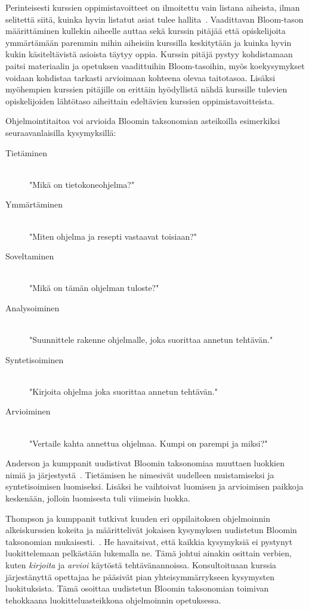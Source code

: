 \documentclass[finnish]{../tktltiki2}
\theoremstyle{definition}
\theoremstyle{remark}
\begin{document}
Perinteisesti kurssien oppimistavoitteet on ilmoitettu vain listana aiheista, ilman selitettä siitä, kuinka hyvin listatut asiat tulee hallita~\cite{SMS08}. Vaadittavan Bloom-tason määrittäminen kullekin aiheelle auttaa sekä kurssin pitäjää että opiskelijoita ymmärtämään paremmin mihin aiheisiin kurssilla keskitytään ja kuinka hyvin kukin käsiteltävistä asioista täytyy oppia. Kurssin pitäjä pystyy kohdistamaan paitsi materiaalin ja opetuksen vaadittuihin Bloom-tasoihin, myös koekysymykset voidaan kohdistaa tarkasti arvioimaan kohteena olevaa taitotasoa. Lisäksi myöhempien kurssien pitäjille on erittäin hyödyllistä nähdä kurssille tulevien opiskelijoiden lähtötaso aiheittain edeltävien kurssien oppimistavoitteista.

Ohjelmointitaitoa voi arvioida Bloomin taksonomian asteikoilla esimerkiksi seuraavanlaisilla kysymyksillä:

\begin{description}
  \item[Tietäminen] \hfill \\
  "Mikä on tietokoneohjelma?"
  \item[Ymmärtäminen] \hfill \\
  "Miten ohjelma ja resepti vastaavat toisiaan?"
  \item[Soveltaminen] \hfill \\
  "Mikä on tämän ohjelman tuloste?"
  \item[Analysoiminen] \hfill \\
  "Suunnittele rakenne ohjelmalle, joka suorittaa annetun tehtävän."
  \item[Syntetisoiminen] \hfill \\
  "Kirjoita ohjelma joka suorittaa annetun tehtävän."
  \item[Arvioiminen] \hfill \\
  "Vertaile kahta annettua ohjelmaa. Kumpi on parempi ja miksi?"
\end{description}

Anderson ja kumppanit uudistivat Bloomin taksonomiaa muuttaen luokkien nimiä ja järjestystä~\cite{AKA00}. Tietämisen he nimesivät uudelleen muistamiseksi ja syntetisoimisen luomiseksi. Lisäksi he vaihtoivat luomisen ja arvioimisen paikkoja keskenään, jolloin luomisesta tuli viimeisin luokka.

Thompson ja kumppanit tutkivat kuuden eri oppilaitoksen ohjelmoinnin alkeiskurssien kokeita ja määrittelivät jokaisen kysymyksen uudistetun Bloomin taksonomian mukaisesti.~\cite{TLW08}. He havaitsivat, että kaikkia kysymyksiä ei pystynyt luokittelemaan pelkästään lukemalla ne. Tämä johtui ainakin osittain verbien, kuten \textit{kirjoita} ja \textit{arvioi} käytöstä tehtävänannoissa. Konsultoituaan kurssia järjestänyttä opettajaa he pääsivät pian yhteisymmärrykseen kysymysten luokituksista. Tämä osoittaa uudistetun Bloomin taksonomian toimivan tehokkaana luokitteluasteikkona ohjelmoinnin opetuksessa.
\end{document}
